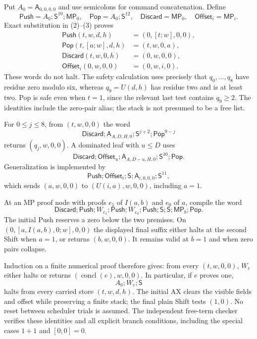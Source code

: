 Put $A_0=\mathsf A_{0,0,0,0}$ and use semicolons for command
concatenation. Define
\[
 \mathsf{Push}=A_0;\mathsf S^{10};\mathsf{MP}_0,
 \quad\mathsf{Pop}=A_0;\mathsf S^{12},
 \quad\mathsf{Discard}=\mathsf{MP}_0,
 \quad\mathsf{Offset}_i=\mathsf{MP}_i.
\]
Exact substitution in (2)--(3) proves
\begin{align*}
 \mathsf{Push}(t,w,d,h)&=(0,[t;w],0,0),\\
 \mathsf{Pop}(t,[a;w],d,h)&=(t,w,0,a),\\
 \mathsf{Discard}(t,w,0,h)&=(0,w,0,0),\\
 \mathsf{Offset}_i(0,w,0,0)&=(0,w,i,0).
\end{align*}
These words do not halt. The safety calculation uses precisely that
$q_0,\ldots,q_8$ have residue zero modulo six, whereas
$q_9=U(d,h)$ has residue two and is at least two. Pop is safe even
when $t=1$, since the relevant last test contains $q_9\ge2$.
The identities include the zero-pair alias; the stack is not presumed
to be a free list.

For $0\le j\le8$, from $(t,w,0,0)$ the word
\[
 \mathsf{Discard};\mathsf A_{A,D,H,0};
              \mathsf S^{j+2};\mathsf{Pop}^{9-j}
                                                        \tag{4}
\]
returns $(q_j,w,0,0)$. A dominated leaf with $u\le D$ uses
\[
 \mathsf{Discard};\mathsf{Offset}_u;
 \mathsf A_{A,D-u,H,0};\mathsf S^{10};\mathsf{Pop}.
\]
Generalization is implemented by
\[
 \mathsf{Push};\mathsf{Offset}_i;\mathsf S;
                  \mathsf A_{i,0,0,0};\mathsf S^{11},
\]
which sends $(a,w,0,0)$ to $(U(i,a),w,0,0)$, including $a=1$.

At an MP proof node with proofs $e_1$ of $I(a,b)$ and $e_0$ of $a$,
compile the word
\[
 \mathsf{Discard};\mathsf{Push};W_{e_1};\mathsf{Push};
 W_{e_0};\mathsf{Push};\mathsf S;\mathsf S;
                         \mathsf{MP}_b;\mathsf{Pop}.
\]
The initial Push reserves a zero below the two premises. On
$(0,[a,I(a,b),0;w],0,0)$ the displayed final suffix either halts
at the second Shift when $a=1$, or returns $(b,w,0,0)$.
It remains valid at $b=1$ and when zero pairs collapse.

Induction on a finite numerical proof therefore gives: from every
$(t,w,0,0)$, $W_e$ either halts or returns
$(\operatorname{concl}(e),w,0,0)$. In particular, if $e$ proves one,
\[
                            A_0;W_e;\mathsf S             \tag{5}
\]
halts from every carried store $(t,w,d,h)$. The initial AX clears the
visible fields and offset while preserving a finite stack; the final
plain Shift tests $(1,0)$. No reset between scheduler trials is assumed.
The independent free-term checker verifies these identities and all
explicit branch conditions, including the special cases $1+1$ and
$[0;0]=0$.

